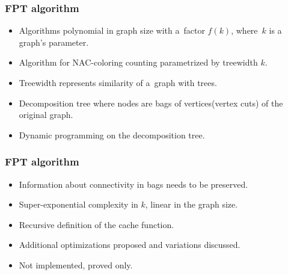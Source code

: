 \documentclass[aspectratio=\myaspectratio]{beamer}
\begin{document}
\begin{frame}
	\frametitle{}

\end{frame}
\begin{frame}
	\frametitle{}

\end{frame}
\begin{frame}
	\frametitle{}

\end{frame}
\begin{frame}
	\frametitle{}

\end{frame}

\begin{frame}
	\frametitle{FPT algorithm}
	\begin{itemize}
		\item
		      Algorithms polynomial in graph size with a factor \( f(k) \), where~\( k \) is a graph's parameter.
		\item
		      Algorithm for NAC-coloring counting parametrized by treewidth \( k \).
		\item
		      Treewidth represents similarity of a graph with trees.
		\item
		      Decomposition tree where nodes are bags of vertices\newline{}(vertex cuts) of the original graph.
		\item
		      Dynamic programming on the decomposition tree.
	\end{itemize}
\end{frame}

\begin{frame}
	\frametitle{FPT algorithm}
	\begin{itemize}
		\item
		      Information about connectivity in bags needs to be preserved.
		\item
		      Super-exponential complexity in \( k \), linear in the graph size.
		\item
		      Recursive definition of the cache function.
		\item
		      Additional optimizations proposed and variations discussed.
		\item
		      Not implemented, proved only.
	\end{itemize}
\end{frame}
\end{document}
